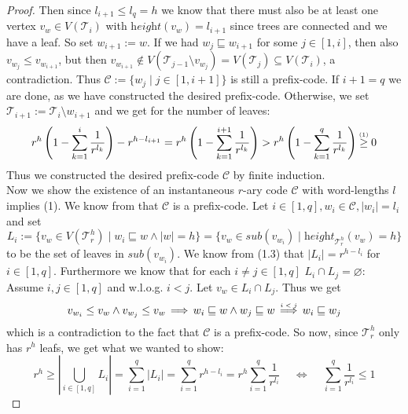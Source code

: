 \documentclass[12pt]{article}
\newcommand{\up}[2]{\mathrel{\overset{\makebox[0pt]{\mbox{\normalfont\tiny #2}}}{#1}}}
\newcommand{\T}[0]{{\mathcal{T}_r^h}}
\newcommand{\he}[0]{\textit{height}}
\newcommand{\SUB}[0]{\textit{sub}}
\newenvironment{statement3}[3]{\begin{trivlist}
\item[\hskip \labelsep {\bfseries #1}\hskip \labelsep {\bfseries #2} {#3}\textbf{.}]}{\end{trivlist}}
\begin{document}
\begin{statement3}{(1.6)}{Theorem}{(Kraft's Inequality)}
\begin{proof}
        Then since $l_{i+1} \leq l_q = h$ we know that there must also be at least one vertex
        $v_w \in V(\mathcal{T}_i)$ with $\he(v_w) = l_{i+1}$ since trees are connected and we have a leaf.
        So set $w_{i+1} := w$. If we had $w_j \sqsubseteq w_{i+1}$ for
        some $j \in [1,i]$, then also $v_{w_j} \leq v_{w_{i+1}}$, but then
        $v_{w_{i+1}} \notin V(\mathcal{T}_{j-1} \setminus v_{w_j}) = V(\mathcal{T}_{j}) \subseteq V(\mathcal{T}_{i})$, a contradiction.
        Thus $\mathcal{C} := \{w_j \mid j \in [1, i+1]\}$ is still a prefix-code.
        If $i+1 = q$ we are done, as we have constructed the desired prefix-code. Otherwise,
        we set $\mathcal{T}_{i+1} := \mathcal{T}_i \setminus w_{i+1}$ and we get for the number of leaves:
        $$
            r^h\left(1-\sum_{k=1}^{i} \frac{1}{r^{l_k}}\right) - r^{h - l_{i+1}}
            = r^h\left(1-\sum_{k=1}^{i+1} \frac{1}{r^{l_k}}\right)
            > r^h\left(1-\sum_{k=1}^{q} \frac{1}{r^{l_k}}\right)
            \up{\geq}{(1)} 0
        $$
        Thus we constructed the desired prefix-code $\mathcal{C}$ by finite induction.\\[10pt]
        Now we show the existence of an instantaneous $r$-ary code $\mathcal{C}$ with word-lengths $l$ implies (1).
        We know from \cite{ICT} that $\mathcal{C}$ is a prefix-code. Let $i \in [1,q],
        w_i \in \mathcal{C}, |w_i| = l_i$ and set
        $$
            L_i := \{v_w \in V(\T) \mid w_i \sqsubseteq w \land |w| = h\}
            = \{v_w \in \SUB(v_{w_i}) \mid \he_\T(v_w) = h\}
        $$
        to be the set of leaves in $\SUB(v_{w_i})$. We know from (1.3) that $|L_i| = r^{h - l_i}$
        for $i \in [1,q]$.
        Furthermore we know that for each $i\neq j \in [1,q]$ $L_i \cap L_j = \varnothing$:\\
        Assume $i,j \in [1,q]$ and w.l.o.g. $i < j$. Let $v_w \in L_i \cap L_j$. Thus we get
        $$
            v_{w_i} \leq v_w \land v_{w_j} \leq v_w \,\Longrightarrow\, w_i \sqsubseteq w \land w_j \sqsubseteq w
            \up{\,\Longrightarrow\,}{$i < j$} w_i \sqsubseteq w_j
        $$
        which is a contradiction to the fact that $\mathcal{C}$ is a prefix-code.
        So now, since $\T$ only has $r^h$ leafs, we get what we wanted to show:
        $$
            r^h \geq |\bigcup_{i \in [1,q]} L_i| = \sum_{i = 1}^{q} |L_i| = \sum_{i=1}^{q} r^{h-l_i}
            = r^h\sum_{i=1}^{q} \frac{1}{r^{l_i}}
            \quad\,\Longleftrightarrow\,\quad \sum_{i=1}^{q} \frac{1}{r^{l_i}} \leq 1
        $$
    \end{proof}
\end{statement3}
\end{document}
